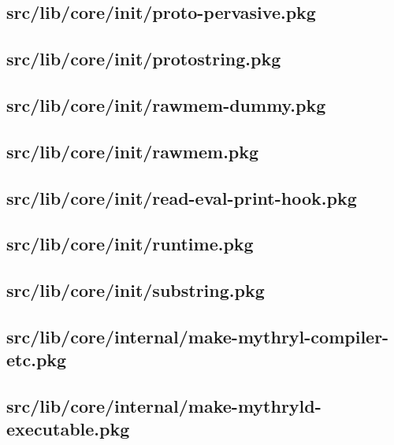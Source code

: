 \subsection{src/lib/core/init/proto-pervasive.pkg}


\subsection{src/lib/core/init/protostring.pkg}


\subsection{src/lib/core/init/rawmem-dummy.pkg}


\subsection{src/lib/core/init/rawmem.pkg}


\subsection{src/lib/core/init/read-eval-print-hook.pkg}


\subsection{src/lib/core/init/runtime.pkg}


\subsection{src/lib/core/init/substring.pkg}


\subsection{src/lib/core/internal/make-mythryl-compiler-etc.pkg}


\subsection{src/lib/core/internal/make-mythryld-executable.pkg}


